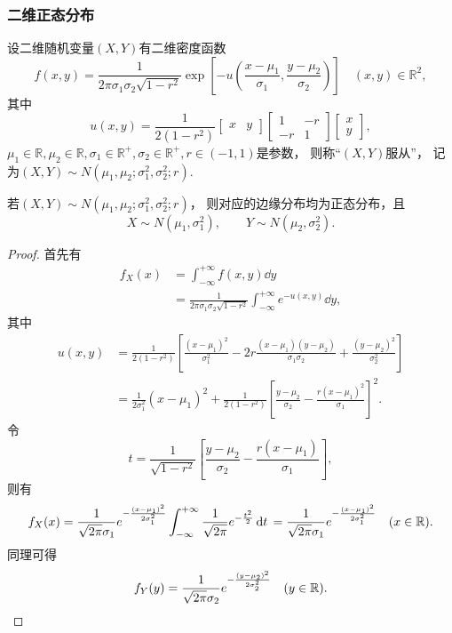 \subsubsection{二维正态分布}
\begin{definition}
设二维随机变量\((X,Y)\)有二维密度函数
\begin{equation}
	f(x,y) = \frac{1}{2\pi\sigma_1\sigma_2\sqrt{1-r^2}}
		\exp\left[- u\left(
			\frac{x-\mu_1}{\sigma_1},
			\frac{y-\mu_2}{\sigma_2}
		\right)\right]
	\quad(x,y)\in\mathbb{R}^2,
\end{equation}
其中\[
	u(x,y)
	= \frac{1}{2(1-r^2)}
	\begin{bmatrix}
		x & y
	\end{bmatrix}
	\begin{bmatrix}
		1 & -r \\
		-r & 1
	\end{bmatrix}
	\begin{bmatrix}
		x \\ y
	\end{bmatrix},
\]
\(\mu_1\in\mathbb{R},
\mu_2\in\mathbb{R},
\sigma_1\in\mathbb{R}^+,
\sigma_2\in\mathbb{R}^+,
r\in(-1,1)\)是参数，
则称“\((X,Y)\)服从”，
记为\((X,Y) \sim N(\mu_1,\mu_2;\sigma_1^2,\sigma_2^2;r)\).
\end{definition}

\begin{theorem}\label{theorem:正态分布与自然指数分布族.性质1}
若\((X,Y) \sim N(\mu_1,\mu_2;\sigma_1^2,\sigma_2^2;r)\)，
则对应的边缘分布均为正态分布，且\[
	X \sim N(\mu_1,\sigma_1^2),
	\qquad
	Y \sim N(\mu_2,\sigma_2^2).
\]
\begin{proof}
首先有\begin{align*}
	f_X(x) &= \int_{-\infty}^{+\infty} f(x,y) \dd{y} \\
	&= \frac{1}{2\pi\sigma_1\sigma_2\sqrt{1-r^2}}
		\int_{-\infty}^{+\infty} e^{-u(x,y)} \dd{y},
\end{align*}
其中\begin{align*}
	u(x,y)
	&= \frac{1}{2(1-r^2)} \left[
			\frac{(x-\mu_1)^2}{\sigma_1^2}
			-2r\frac{(x-\mu_1)(y-\mu_2)}{\sigma_1\sigma_2}
			+\frac{(y-\mu_2)^2}{\sigma_2^2}
		\right] \\
	&= \frac{1}{2 \sigma_1^2} (x-\mu_1)^2
		+ \frac{1}{2(1-r^2)} \left[
			\frac{y-\mu_2}{\sigma_2}
			- \frac{r(x-\mu_1)^2}{\sigma_1}
		\right]^2.
\end{align*}
令\[
t = \frac{1}{\sqrt{1-r^2}} \left[
\frac{y-\mu_2}{\sigma_2}
- \frac{r(x-\mu_1)}{\sigma_1}
\right],
\]则有\[
f_X(x)
= \frac{1}{\sqrt{2\pi} \sigma_1} e^{-\frac{(x-\mu_1)^2}{2\sigma_1^2}} \int_{-\infty}^{+\infty} \frac{1}{\sqrt{2\pi}} e^{-\frac{t^2}{2}} \dd{t} \\
= \frac{1}{\sqrt{2\pi} \sigma_1} e^{-\frac{(x-\mu_1)^2}{2\sigma_1^2}}
\quad(x\in\mathbb{R}).
\]
同理可得\[
f_Y(y)
= \frac{1}{\sqrt{2\pi} \sigma_2} e^{-\frac{(y-\mu_2)^2}{2\sigma_2^2}}
\quad(y\in\mathbb{R}).
\qedhere
\]
\end{proof}
\end{theorem}

